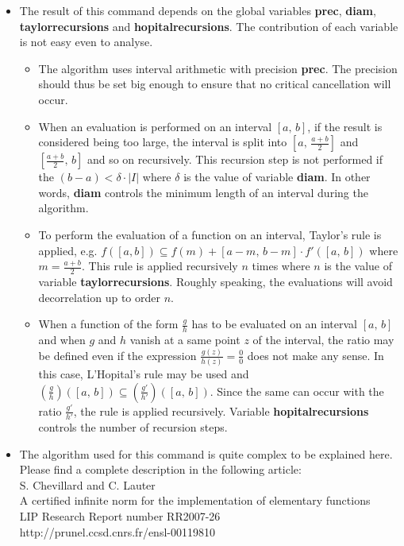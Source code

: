 \begin{itemize}
\item The result of this command depends on the global variables \textbf{prec}, \textbf{diam},
   \textbf{taylorrecursions} and \textbf{hopitalrecursions}. The contribution of each variable is 
   not easy even to analyse.
   \begin{itemize}
   \item  The algorithm uses interval arithmetic with precision \textbf{prec}. The
     precision should thus be set big enough to ensure that no critical
     cancellation will occur.
   \item  When an evaluation is performed on an interval $[a,\,b]$, if the result
     is considered being too large, the interval is split into $[a,\,\frac{a+b}{2}]$
     and $[\frac{a+b}{2},\,b]$ and so on recursively. This recursion step
     is  not performed if the $(b-a) < \delta \cdot |I|$ where $\delta$ is the value
     of variable \textbf{diam}. In other words, \textbf{diam} controls the minimum length of an
     interval during the algorithm.
   \item  To perform the evaluation of a function on an interval, Taylor's rule is
     applied, e.g. $f([a,b]) \subseteq f(m) + [a-m,\,b-m] \cdot f'([a,\,b])$
     where $m=\frac{a+b}{2}$. This rule is applied recursively $n$ times
     where $n$ is the value of variable \textbf{taylorrecursions}. Roughly speaking,
     the evaluations will avoid decorrelation up to order $n$.
   \item  When a function of the form $\frac{g}{h}$ has to be evaluated on an
     interval $[a,\,b]$ and when $g$ and $h$ vanish at a same point
     $z$ of the interval, the ratio may be defined even if the expression
     $\frac{g(z)}{h(z)}=\frac{0}{0}$ does not make any sense. In this case, L'Hopital's rule
     may be used and $\left(\frac{g}{h}\right)([a,\,b]) \subseteq \left(\frac{g'}{h'}\right)([a,\,b])$.
     Since the same can occur with the ratio $\frac{g'}{h'}$, the rule is applied
     recursively. Variable \textbf{hopitalrecursions} controls the number of 
     recursion steps.
   \end{itemize}

\item The algorithm used for this command is quite complex to be explained here. 
   Please find a complete description in the following article:\\
        S. Chevillard and C. Lauter\\
        A certified infinite norm for the implementation of elementary functions\\
        LIP Research Report number RR2007-26\\
        http://prunel.ccsd.cnrs.fr/ensl-00119810\\
\end{itemize}
